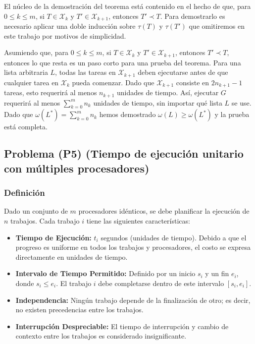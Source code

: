 \documentclass[14pt]{extarticle}
\begin{document}
El núcleo de la demostración del teorema está contenido en el hecho de que, para $0 \leq k \leq m$, si $T \in \mathcal{X}_k$ y $T' \in \mathcal{X}_{k+1}$, entonces $T' \prec T$. Para demostrarlo es necesario aplicar una doble inducción sobre $\tau(T)$ y $\tau(T')$ que omitiremos en este trabajo por motivos de simplicidad.

Asumiendo que, para $0 \leq k \leq m$, si $T \in \mathcal{X}_k$ y $T' \in \mathcal{X}_{k+1}$, entonces $T' \prec T$, entonces lo que resta es un paso corto para una prueba del teorema. Para una lista arbitraria $L$, todas las tareas en $\mathcal{X}_{k+1}$ deben ejecutarse antes de que cualquier tarea en $\mathcal{X}_k$ pueda comenzar. Dado que $\mathcal{X}_{k+1}$ consiste en $2n_{k+1} - 1$ tareas, esto requerirá al menos $n_{k+1}$ unidades de tiempo. Así, ejecutar $G$ requerirá al menos $\sum_{k=0}^{m} n_k$ unidades de tiempo, sin importar qué lista $L$ se use. Dado que $\omega(L^*) = \sum_{k=0}^{m} n_k$ hemos demostrado $\omega(L) \geq \omega(L^*)$ y la prueba está completa.

\subsection*{Problema (P5) (Tiempo de ejecución unitario con múltiples procesadores)}

\subsubsection*{Definición}

Dado un conjunto de $m$ procesadores idénticos, se debe planificar la ejecución de $n$ trabajos. Cada trabajo $i$ tiene las siguientes características:

\begin{itemize}
    \item \textbf{Tiempo de Ejecución:} $t_i$ segundos (unidades de tiempo). Debido a que el progreso es uniforme en todos los trabajos y procesadores, el costo se expresa directamente en unidades de tiempo.
    \item \textbf{Intervalo de Tiempo Permitido:} Definido por un inicio $s_i$ y un fin $e_i$, donde $s_i \leq e_i$. El trabajo $i$ debe completarse dentro de este intervalo $[s_i, e_i]$.
    \item \textbf{Independencia:} Ningún trabajo depende de la finalización de otro; es decir, no existen precedencias entre los trabajos.
    \item \textbf{Interrupción Despreciable:} El tiempo de interrupción y cambio de contexto entre los trabajos es considerado insignificante.
\end{itemize}
\end{document}
